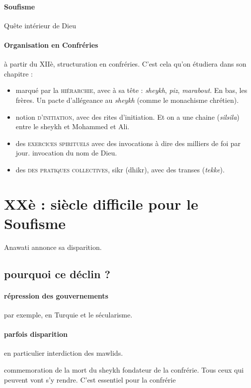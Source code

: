 \paragraph{Soufisme}
Quête intérieur de Dieu

\paragraph{Organisation en Confréries} à partir du XIIè, structuration en confréries. C'est cela qu'on étudiera dans son chapitre :
\begin{itemize}
    \item marqué par la \textsc{hiérarchie}, avec à sa tête : \textit{sheykh}, \textit{piz}, \textit{marabout}. En bas, les frères. Un pacte d'allégeance au \textit{sheykh} (comme le monachisme chrétien).
    \item notion \textsc{d'initiation}, avec des rites d'initiation. Et on a une chaine (\textit{silsila}) entre le sheykh et Mohammed et Ali.
    \item des \textsc{exercices spirituels} avec des invocations à dire des milliers de foi par jour. invocation du nom de Dieu. 
    \item des \textsc{des pratiques collectives}, sikr (dhikr), avec des transes (\textit{tekke}).
    
\end{itemize}

\section{XXè : siècle difficile pour le Soufisme}
Anawati annonce sa disparition.

\subsection{pourquoi ce déclin ?}

\paragraph{répression des gouvernements} par exemple, en Turquie et le sécularisme.

\paragraph{parfois disparition} en particulier interdiction des mawlids.
\begin{Def}
commemoration de la mort du sheykh fondateur de la confrérie. Tous ceux qui peuvent vont s'y rendre. C'est essentiel pour la confrérie
\end{Def}

